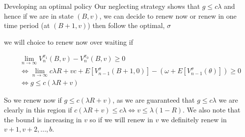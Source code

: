 \documentclass[10pt]{beamer}
\begin{document}
\begin{frame}{Developing an optimal policy}
Our neglecting strategy shows that $g \leq c \lambda$ and hence if we are in state $(B,v)$, we can decide to renew now or renew in one time period (at $(B+1,v)$) then follow the optimal, $\sigma$

we will choice to renew now over waiting if

\begin{align*}
&\lim\limits_{n \rightarrow \infty} V_{n}^{\pi_{1}} (B,v) - V_{n}^{\pi_{0}}(B,v) \geq 0 \\
& \iff \lim\limits_{n \rightarrow \infty} c \lambda R + vc + E[V_{n-1}^{\sigma}(B+1,0)] - (\omega + E[V_{n-1}^{\sigma}(\theta)]) \geq 0 \\
& \iff g \leq c (\lambda R +v) 
\end{align*}

So we renew now if $g \leq c (\lambda R +v)$, as we are guaranteed that $g \leq c \lambda$ we are clearly in this region if $ c (\lambda R +v) \leq c \lambda \iff v \leq \lambda (1-R)$. We also note that the bound is increasing in $v$ so if we will renew in $v$ we definitely renew in $v+1,v+2,...,b$.

\end{frame}
\end{document}
